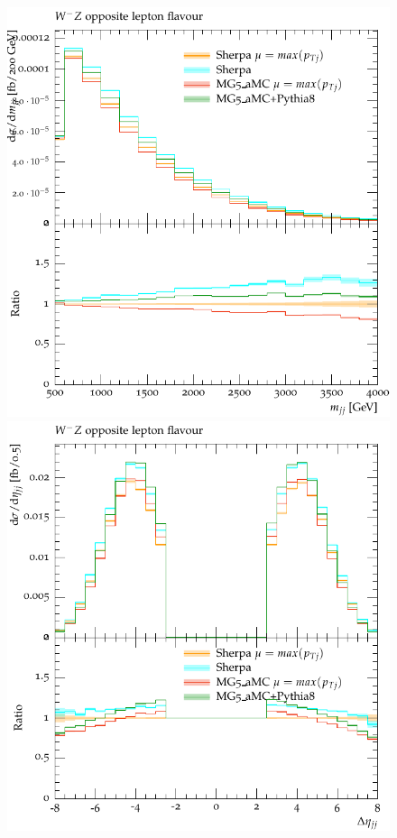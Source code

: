 \documentclass[11pt]{cernrep}
\begin{document}
\begin{figure}[htbp]
\begin{center}
   \includegraphics[scale=0.65]{figs/dyn_WmZ_OF_mjj}
   \includegraphics[scale=0.65]{figs/dyn_WmZ_OF_dEtajj}

\end{center}
\end{figure}
\end{document}
